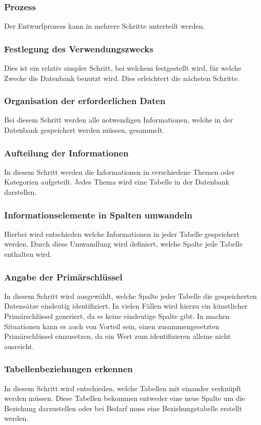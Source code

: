 \subsubsection{Prozess}
Der Entwurfprozess kann in mehrere Schritte unterteilt werden.
\subsubsection{Festlegung des Verwendungszwecks}
Dies ist ein relativ simpler Schritt, bei welchem festgestellt wird, für welche Zwecke die Datenbank benutzt wird. Dies erleichtert die nächsten Schritte.
\subsubsection{Organisation der erforderlichen Daten}
Bei diesem Schritt werden alle notwendigen Informationen, welche in der Datenbank gespeichert werden müssen, gesammelt.
\subsubsection{Aufteilung der Informationen}
In diesem Schritt werden die Informationen in verschiedene Themen oder Kategorien aufgeteilt. Jedes Thema wird eine Tabelle in der Datenbank darstellen.
\subsubsection{Informationselemente in Spalten umwandeln}
Hierbei wird entschieden welche Informationen in jeder Tabelle gespeichert werden. 
Durch diese Umwandlung wird definiert, welche Spalte jede Tabelle enthalten wird.
\subsubsection{Angabe der Primärschlüssel}
In diesem Schritt wird ausgewählt, welche Spalte jeder Tabelle die gespeicherten Datensätze eindeutig identifiziert. In vielen Fällen wird hierzu ein künstlicher Primärschlüssel generiert, da es keine eindeutige Spalte gibt. 
In machen Situationen kann es auch von Vorteil sein, einen zusammengesetzten Primärschlüssel einzusetzen, da ein Wert zum identifizieren alleine nicht ausreicht.
\subsubsection{Tabellenbeziehungen erkennen}
In diesem Schritt wird entschieden, welche Tabellen mit einander verknüpft werden müssen. Diese Tabellen bekommen entweder eine neue Spalte um die Beziehung darzustellen oder bei Bedarf muss eine Beziehungstabelle erstellt werden.
